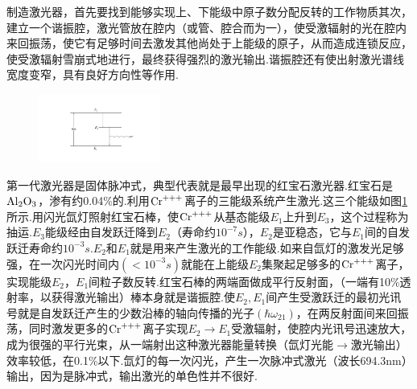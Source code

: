 制造激光器，首先要找到能够实现上、下能级中原子数分配反转的工作物质其次，建立一个谐振腔，激光管放在腔内（或管、腔合而为一），使受激辐射的光在腔内来回振荡，使它有足够时间去激发其他尚处于上能级的原子，从而造成连锁反应，使受激辐射雪崩式地进行，最终获得强烈的激光输出.谐振腔还有使出射激光谱线宽度变窄，具有良好方向性等作用.

\begin{figure}
	\centering
	\small
	\includegraphics[width=4cm,clip]{QM file/figure/9-3}
	\caption{}\label{fig.9-3}
\end{figure}
第一代激光器是固体脉冲式，典型代表就是最早出现的红宝石激光器.红宝石是$\ce{Al_{2}O_{3}}$，渗有约0.04\%的.利用$\ce{Cr^{+++}}$离子的三能级系统产生激光.这三个能级如图\ref{fig.9-3}所示.用闪光氙灯照射红宝石棒，使$\ce{Cr^{+++}}$从基态能级$E_{1}$上升到$E_{3}$，这个过程称为抽运.$E_{3}$能级经由自发跃迁降到$E_{2}$（寿命约$10^{-7}\si{s}$），$E_{2}$是亚稳态，它与$E_{1}$间的自发跃迁寿命约$10^{-3}\si{s}$.$E_{2}$和$E_{1}$就是用来产生激光的工作能级.如来自氙灯的激发光足够强，在一次闪光时间内$(<10^{-3}\si{s})$就能在上能级$E_{2}$集聚起足够多的$\ce{Cr^{+++}}$离子，实现能级$E_{2}$，$E_{1}$间粒子数反转.红宝石棒的两端面做成平行反射面，（一端有10\%透射率，以获得激光输出）棒本身就是谐振腔.使$E_{2},E_{1}$间产生受激跃迁的最初光讯号就是自发跃迁产生的少数沿棒的轴向传播的光子$(\hbar\omega_{21})$，在两反射面间来回振荡，同时激发更多的$\ce{Cr^{+++}}$离子实现$E_{2}\rightarrow E_{1}$受激辐射，使腔内光讯号迅速放大，成为很强的平行光束，从一端射出这种激光器能量转换（氙灯光能$\rightarrow$激光输出）效率较低，在0.1\%以下.氙灯的每一次闪光，产生一次脉冲式激光（波长\num{694.3}\si{nm}）输出，因为是脉冲式，输出激光的单色性并不很好.


